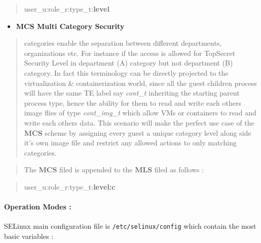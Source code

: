\documentclass[
  14pt,
  english,
  a4paper,
]{scrreprt}
\providecommand{\tightlist}{%
  \setlength{\itemsep}{0pt}\setlength{\parskip}{0pt}}
\begin{document}
\begin{quote}
user\_u:role\_r:type\_t:\textbf{level}
\end{quote}

\begin{itemize}
\tightlist
\item
  \textbf{MCS Multi Category Security}
\end{itemize}

\begin{quote}
categories enable the separation between different departments,
organizations etc. For instance if the access is allowed for TopSecret
Security Level in department (A) category but not department (B)
category. In fact this terminology can be directly projected to the
virtualization \& containerization world, since all the guest children
process will have the same TE label say \emph{cont\_t} inheriting the
starting parent process type, hence the ability for them to read and
write each others image flies of type \emph{cont\_img\_t} which allow
VMs or containers to read and write each others data. This scenario will
make the perfect use case of the \textbf{MCS} scheme by assigning every
guest a unique category level along side it's own image file and
restrict any allowed actions to only matching categories.
\end{quote}

\begin{quote}
The \textbf{MCS} filed is appended to the \textbf{MLS} filed as follows
:
\end{quote}

\begin{quote}
user\_u:role\_r:type\_t:\textbf{level:c}
\end{quote}

\hypertarget{operation-modes}{%
\paragraph{Operation Modes :}\label{operation-modes}}

SELinux main configuration file is \texttt{/etc/selinux/config} which
contain the most basic variables :
\end{document}
